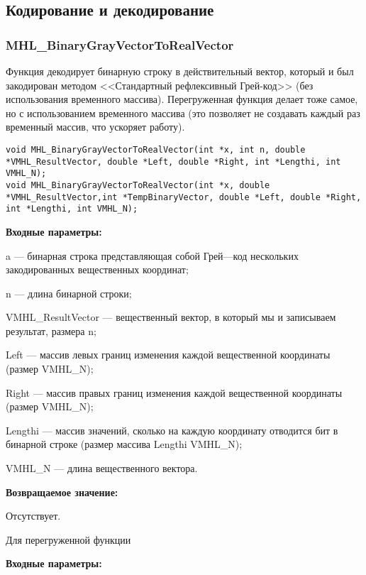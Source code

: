 \documentclass[a4paper,12pt]{article}
\begin{document}
\subsection{Кодирование и декодирование}

\subsubsection{MHL\_BinaryGrayVectorToRealVector}\label{MHL_BinaryGrayVectorToRealVector}

Функция декодирует бинарную строку в действительный вектор, который и был закодирован методом <<Стандартный рефлексивный Грей-код>> (без использования временного массива). Перегруженная функция делает тоже самое, но с использованием временного массива (это позволяет не создавать каждый раз временный массив, что ускоряет работу).


\begin{lstlisting}[label=code_syntax_MHL_BinaryGrayVectorToRealVector,caption=Синтаксис]
void MHL_BinaryGrayVectorToRealVector(int *x, int n, double *VMHL_ResultVector, double *Left, double *Right, int *Lengthi, int VMHL_N);
void MHL_BinaryGrayVectorToRealVector(int *x, double *VMHL_ResultVector,int *TempBinaryVector, double *Left, double *Right, int *Lengthi, int VMHL_N);
\end{lstlisting}

\textbf{Входные параметры:}
 
a --- бинарная строка представляющая собой Грей---код нескольких закодированных вещественных координат;
 
n --- длина бинарной строки;
 
VMHL\_ResultVector --- вещественный вектор, в который мы и записываем результат, размера n;
 
Left --- массив левых границ изменения каждой вещественной координаты (размер VMHL\_N);
 
Right --- массив правых границ изменения каждой вещественной координаты (размер VMHL\_N);
 
Lengthi --- массив значений, сколько на каждую координату отводится бит в бинарной строке (размер массива Lengthi VMHL\_N);
 
VMHL\_N --- длина вещественного вектора.
 

\textbf{Возвращаемое значение:}
 
Отсутствует.
  
Для перегруженной функции
  
\textbf{Входные параметры:}
 
\end{document}
